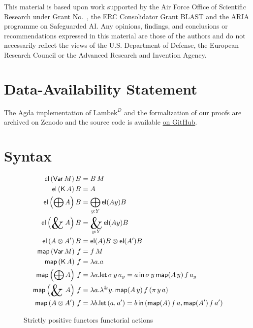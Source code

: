 \documentclass[acmsmall,nonacm]{acmart}
\newcommand{\Var}{\mathsf{Var}}
\newcommand{\K}{\mathsf{K}}
\newcommand{\map}{\mathsf{map}}
\newcommand{\theoryabbv}{$\textrm{Lambek}^D$\xspace}
\DeclareMathOperator*{\bigamp}{\scalerel*{\&}{\bigoplus}}
\DeclareMathOperator*{\bigwith}{\scalerel*{\&}{\bigoplus}}
\newcommand{\oplusinj}[2]{\sigma\,#1\,#2}
\newcommand{\withprj}[2]{\pi\,#1\,#2}
\newcommand{\el}{\mathsf{el}}
\newcommand{\letin}[3]{\mathsf{let}\, #1 = #2 \, \mathsf{in}\, #3}
\newcommand{\withlamb}[2]{{\lambda}^{{\&}} #1.\, #2}
\begin{document}
{\newpage

\begin{acks}
  This material is based upon work supported by the Air Force Office of
  Scientific Research under Grant No.~, the ERC
  Consolidator Grant BLAST and the ARIA programme on Safeguarded AI. Any
  opinions, findings, and conclusions or recommendations expressed in this
  material are those of the authors and do not necessarily reflect the views of
  the U.S. Department of Defense, the European Research Council or the Advanced
  Research and Invention Agency.
\end{acks}

\section*{Data-Availability Statement}
The Agda implementation of \theoryabbv and the formalization of our proofs are archived on Zenodo \cite{schaefer_2025_15243560} and the source code is available \href{https://github.com/maxsnew/grammars-and-semantic-actions/tree/PLDI25Artifact}{on GitHub}.



\newpage
\ifarxiv
\appendix
\section{Syntax}
\label{sec:syntax}

\begin{figure}
  \begin{align*}
    \el\left(\Var\,M\right) B &= B\,M\\
    \el\left(\mathsf{K}\,A\right) B &= A\\
    \el\left(\bigoplus A\right) B &= \bigoplus_{y:Y}\el(A y)B\\
    \el\left(\bigamp A\right) B &= \bigamp_{y:Y}\el(A y)B\\
    \el\left(A \otimes A'\right) B &= \el(A)B \otimes \el(A')B \\
    \map\left(\Var\,M\right)\,f &= f\,M\\
    \map\left(\K\,A\right)\,f &= \lambda a. a\\
    \map\left(\bigoplus A\right)\,f &= \lambda a. \letin{\oplusinj y {a_y}}{a}{\oplusinj y {\map(A\,y)\,f\,a_y}}\\
    \map\left(\bigwith\,A\right)\,f &= \lambda a. \withlamb{y}{\map(A\,y)\,f\,(\withprj y a)}\\
    \map\left(A \otimes A'\right)\,f &= \lambda b. \letin{(a,a')}{b}{(\map(A)\,f\,a,\map(A')\,f\,a')}
  \end{align*}
  \caption{Strictly positive functors functorial actions}
  \label{fig:spf-act}
\end{figure}

}
\end{document}
